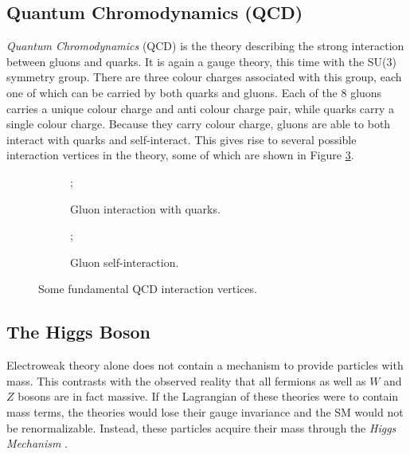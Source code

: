 \subsection{Quantum Chromodynamics (QCD)}
\textit{Quantum Chromodynamics} (QCD) \cite{pdg_rev,black_book} is the theory describing the strong interaction between gluons and quarks. It is again a gauge theory, this time with the SU(3) symmetry group. There are three colour charges associated with this group, each one of which can be carried by both quarks and gluons. Each of the 8 gluons carries a unique colour charge and anti colour charge pair, while quarks carry a single colour charge. Because they carry colour charge, gluons are able to both interact with quarks and self-interact. This gives rise to several possible interaction vertices in the theory, some of which are shown in Figure \ref{fig:QCDVertices}.

\begin{figure}[H]
    \begin{subfigure}{.5\textwidth}
        \centering
        ;
        \caption{Gluon interaction with quarks.}
        \label{fig:QCDvertexa}
    \end{subfigure}
    \begin{subfigure}{.5\textwidth}
        \centering
        ;
        \caption{Gluon self-interaction.}
        \label{fig:QCDVertexb}
    \end{subfigure}
    \caption{Some fundamental QCD interaction vertices.}
    \label{fig:QCDVertices}
\end{figure}

\subsection{The Higgs Boson}
Electroweak theory alone does not contain a mechanism to provide particles with mass. This contrasts with the observed reality that all fermions as well as $W$ and $Z$ bosons are in fact massive. If the Lagrangian of these theories were to contain mass terms, the theories would lose their gauge invariance and the SM would not be renormalizable. Instead, these particles acquire their mass through the \textit{Higgs Mechanism} \cite{Englert, Higgs1, Higgs2}.

